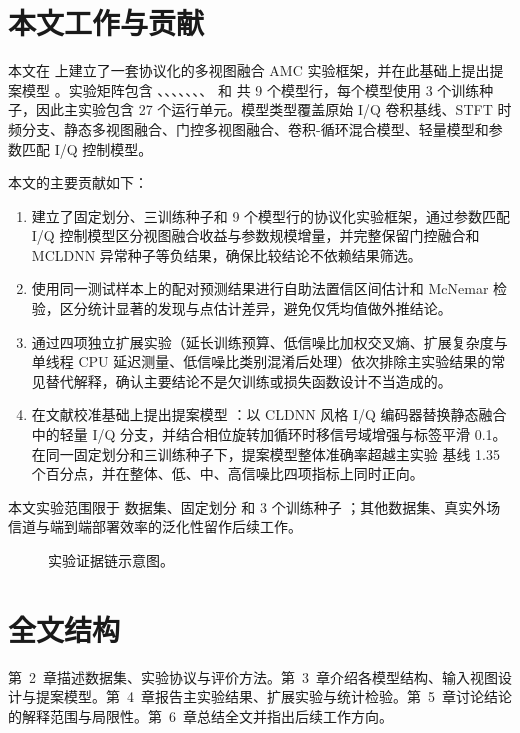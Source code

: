 \section{本文工作与贡献}

本文在 \datasetname{} 上建立了一套协议化的多视图融合 AMC 实验框架，并在此基础上提出提案模型 。实验矩阵包含 、、、、、、、 和  共 9 个模型行，每个模型使用 3 个训练种子，因此主实验包含 27 个运行单元。模型类型覆盖原始 I/Q 卷积基线、STFT 时频分支、静态多视图融合、门控多视图融合、卷积-循环混合模型、轻量模型和参数匹配 I/Q 控制模型。

本文的主要贡献如下：
\begin{enumerate}
  \item 建立了固定划分、三训练种子和 9 个模型行的协议化实验框架，通过参数匹配 I/Q 控制模型区分视图融合收益与参数规模增量，并完整保留门控融合和 MCLDNN 异常种子等负结果，确保比较结论不依赖结果筛选。
  \item 使用同一测试样本上的配对预测结果进行自助法置信区间估计和 McNemar 检验\cite{efron1979bootstrap,mcnemar1947note}，区分统计显著的发现与点估计差异，避免仅凭均值做外推结论。
  \item 通过四项独立扩展实验（延长训练预算、低信噪比加权交叉熵、扩展复杂度与单线程 CPU 延迟测量、低信噪比类别混淆后处理）依次排除主实验结果的常见替代解释，确认主要结论不是欠训练或损失函数设计不当造成的。
  \item 在文献校准基础上提出提案模型 ：以 CLDNN 风格 I/Q 编码器替换静态融合中的轻量 I/Q 分支，并结合相位旋转加循环时移信号域增强与标签平滑 0.1。在同一固定划分和三训练种子下，提案模型整体准确率超越主实验  基线 1.35 个百分点，并在整体、低、中、高信噪比四项指标上同时正向。
\end{enumerate}

本文实验范围限于 \datasetname{} 数据集、固定划分 \splitname{} 和 3 个训练种子 \mainseeds{}；其他数据集、真实外场信道与端到端部署效率的泛化性留作后续工作。

\begin{figure}[H]
  \centering
  
  \caption{实验证据链示意图。}
  \label{fig:protocol-pipeline}
\end{figure}


\section{全文结构}

第~2~章描述数据集、实验协议与评价方法。第~3~章介绍各模型结构、输入视图设计与提案模型。第~4~章报告主实验结果、扩展实验与统计检验。第~5~章讨论结论的解释范围与局限性。第~6~章总结全文并指出后续工作方向。
